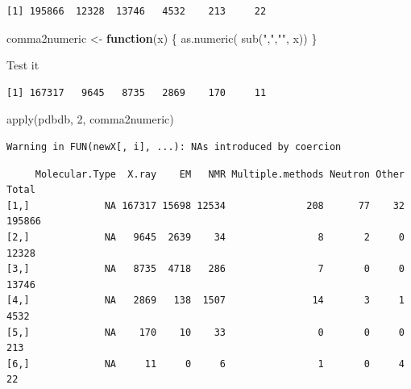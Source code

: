 \documentclass[
  letterpaper,
  DIV=11,
  numbers=noendperiod]{scrartcl}
\newenvironment{Shaded}{\begin{snugshade}}{\end{snugshade}}
\newcommand{\ControlFlowTok}[1]{\textcolor[rgb]{0.00,0.23,0.31}{\textbf{#1}}}
\newcommand{\DecValTok}[1]{\textcolor[rgb]{0.68,0.00,0.00}{#1}}
\newcommand{\FunctionTok}[1]{\textcolor[rgb]{0.28,0.35,0.67}{#1}}
\newcommand{\NormalTok}[1]{\textcolor[rgb]{0.00,0.23,0.31}{#1}}
\newcommand{\OtherTok}[1]{\textcolor[rgb]{0.00,0.23,0.31}{#1}}
\newcommand{\SpecialCharTok}[1]{\textcolor[rgb]{0.37,0.37,0.37}{#1}}
\newcommand{\StringTok}[1]{\textcolor[rgb]{0.13,0.47,0.30}{#1}}
\begin{document}
\begin{Shaded}
\end{Shaded}

\begin{verbatim}
[1] 195866  12328  13746   4532    213     22
\end{verbatim}

\begin{Shaded}
\begin{Highlighting}[]
\NormalTok{comma2numeric }\OtherTok{\textless{}{-}} \ControlFlowTok{function}\NormalTok{(x) \{}
  \FunctionTok{as.numeric}\NormalTok{( }\FunctionTok{sub}\NormalTok{(}\StringTok{","}\NormalTok{,}\StringTok{""}\NormalTok{, x))}
\NormalTok{\}}
\end{Highlighting}
\end{Shaded}

Test it

\begin{Shaded}
\end{Shaded}

\begin{verbatim}
[1] 167317   9645   8735   2869    170     11
\end{verbatim}

\begin{Shaded}
\begin{Highlighting}[]
\FunctionTok{apply}\NormalTok{(pdbdb, }\DecValTok{2}\NormalTok{, comma2numeric)}
\end{Highlighting}
\end{Shaded}

\begin{verbatim}
Warning in FUN(newX[, i], ...): NAs introduced by coercion
\end{verbatim}

\begin{verbatim}
     Molecular.Type  X.ray    EM   NMR Multiple.methods Neutron Other  Total
[1,]             NA 167317 15698 12534              208      77    32 195866
[2,]             NA   9645  2639    34                8       2     0  12328
[3,]             NA   8735  4718   286                7       0     0  13746
[4,]             NA   2869   138  1507               14       3     1   4532
[5,]             NA    170    10    33                0       0     0    213
[6,]             NA     11     0     6                1       0     4     22
\end{verbatim}
\end{document}
